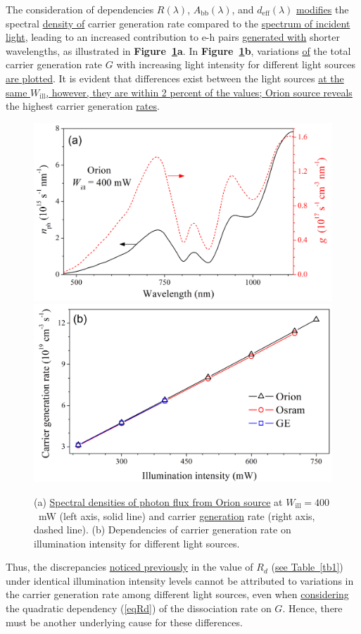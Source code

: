 \documentclass{WileyMSP-template}
\begin{document}
The consideration of dependencies $R(\lambda)$, $A_\mathrm{bb}(\lambda)$, and $d_\mathrm{eff}(\lambda)$ \textcolor[rgb]{0.00,0.07,1.00}{\uline{modifies}}
the spectral \textcolor[rgb]{0.00,0.07,1.00}{\uline{density of}} carrier generation rate compared to the \textcolor[rgb]{0.00,0.07,1.00}{\uline{spectrum of incident light}},
leading to an increased contribution to e-h pairs \textcolor[rgb]{0.00,0.07,1.00}{\uline{generated with}} shorter wavelengths,
as illustrated in \textbf{Figure~\ref{fig5}a}.
In \textbf{Figure~\ref{fig5}b}, variations \textcolor[rgb]{0.00,0.07,1.00}{\uline{of}} the total carrier generation rate $G$ with increasing light intensity for different light sources \textcolor[rgb]{0.00,0.07,1.00}{\uline{are plotted}}.
It is evident that differences exist between the light sources \textcolor[rgb]{0.00,0.07,1.00}{\uline{at the same $W_\mathrm{ill}$,
however, they are within 2 percent of the values;
Orion source reveals}} the highest carrier generation \textcolor[rgb]{0.00,0.07,1.00}{\uline{rates}}.

\begin{figure}
\centering
  \includegraphics[width=0.4\linewidth]{Fig5a.png}
  \includegraphics[width=0.4\linewidth]{Fig5b.png}
  \caption{
  (a) \textcolor[rgb]{0.00,0.07,1.00}{\uline{Spectral densities of photon flux from Orion source}} at $W_\mathrm{ill}=400$~mW (left axis, solid line) and carrier \textcolor[rgb]{0.00,0.07,1.00}{\uline{generation}} rate (right axis, dashed line).
  (b) Dependencies of carrier generation rate on illumination intensity for different light sources.
  }
  \label{fig5}
\end{figure}

Thus, the discrepancies \textcolor[rgb]{0.00,0.07,1.00}{\uline{noticed previously}} in the value of $R_d$ (\textcolor[rgb]{0.00,0.07,1.00}{\uline{see Table~\ref{tb1}}}) under identical illumination intensity levels
cannot be attributed to variations in the carrier generation rate among different light sources,
even when \textcolor[rgb]{0.00,0.07,1.00}{\uline{considering}} the quadratic dependency (\ref{eqRd}) of the dissociation rate on $G$.
Hence, there must be another underlying cause for these differences.
\end{document}
